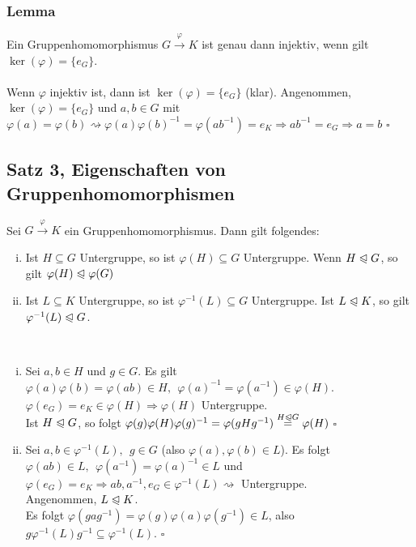 \subsubsection*{Lemma}
Ein Gruppenhomomorphismus $G \stackrel{\varphi}{\to}K$ ist genau dann injektiv, wenn gilt $\ker(\varphi)=\{e_G\}$.\\

\\
Wenn $\varphi$ injektiv ist, dann ist $\ker(\varphi)=\{e_G\}$ (klar). 
Angenommen, $\ker(\varphi)=\{e_G\}$ und $a,b\in G$ mit $\varphi(a)=\varphi(b) \rightsquigarrow \varphi(a)\varphi(b)^{-1}=\varphi(ab^{-1})=e_K \Rightarrow ab^{-1}=e_G \Rightarrow a=b$
\hfill $\square$


\subsection{Satz 3, Eigenschaften von Gruppenhomomorphismen}
\label{sub:satz_eigenschaften}
Sei $G\stackrel{\varphi}{\to}K $ ein Gruppenhomomorphismus. Dann gilt folgendes:
\begin{enumerate}[(i)]
	\item Ist $H\subseteq G$ Untergruppe, so ist $\varphi(H) \subseteq G$ Untergruppe. 
	Wenn $H\trianglelefteqslant G$, so gilt $\varphi(H)\trianglelefteqslant\varphi(G)$
	\item Ist $L\subseteq K$ Untergruppe, so ist $\varphi^{-1}(L) \subseteq G$ Untergruppe. 
	Ist $L\trianglelefteqslant K$, so gilt $\varphi^{-1}(L) \trianglelefteqslant G$.
\end{enumerate}

\\
\begin{enumerate}[(i)]
	\item Sei $a,b\in H$ und $g\in G$. 
	Es gilt $\varphi(a)\varphi(b)=\varphi(ab)\in H,~~\varphi(a)^{-1}=\varphi(a^{-1})\in \varphi(H) $. $\varphi(e_G)=e_K \in \varphi(H) \Rightarrow \varphi(H)$ Untergruppe.\\
	Ist $H\trianglelefteqslant G$, so folgt $\varphi(g)\varphi(H)\varphi(g)^{-1}=\varphi(gHg^{-1})\stackrel{H\trianglelefteqslant G}{=}\varphi(H)$
	\hfill $\square$
	\item Sei $a,b \in \varphi^{-1}(L),~~g \in G$ (also $\varphi(a),\varphi(b) \in L$). 
	Es folgt $\varphi(ab)\in L,~~\varphi(a^{-1})=\varphi(a)^{-1}\in L$ und $\varphi(e_G)=e_K \Rightarrow ab, a^{-1},e_G \in \varphi^{-1}(L) \rightsquigarrow$ Untergruppe.\\
	Angenommen, $L\trianglelefteqslant K$.\\ 
	Es folgt $\varphi(gag^{-1})=\varphi(g)\varphi(a)\varphi(g^{-1}) \in L$, also $g\varphi^{-1}(L)g^{-1} \subseteq \varphi^{-1}(L)$.
	\hfill $\square$
\end{enumerate}

